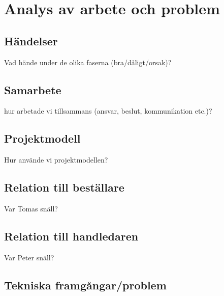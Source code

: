 
\section{Analys av arbete och problem}

\subsection{Händelser}

Vad hände under de olika faserna (bra/dåligt/orsak)?

\subsection{Samarbete}

hur arbetade vi tillsammans (ansvar, beslut, kommunikation etc.)?

\subsection{Projektmodell}

Hur använde vi projektmodellen?

\subsection{Relation till beställare}

Var Tomas snäll?

\subsection{Relation till handledaren}

Var Peter snäll?

\subsection{Tekniska framgångar/problem}
